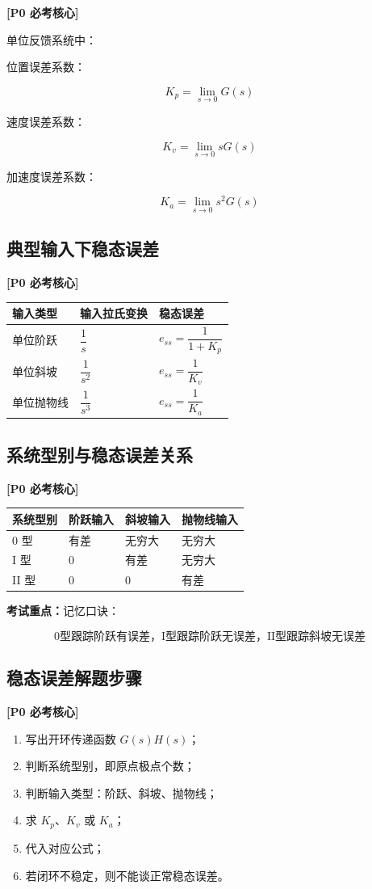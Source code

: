 \documentclass[UTF8,a4paper,12pt]{ctexart}
\newcommand{\Pzero}{\textcolor{p0}{\textbf{[P0 必考核心]}}}
\newcommand{\exam}{\textcolor{p0}{\textbf{考试重点：}}}
\begin{document}
\Pzero

单位反馈系统中：

位置误差系数：

\[
K_p=\lim_{s\to0}G(s)
\]

速度误差系数：

\[
K_v=\lim_{s\to0}sG(s)
\]

加速度误差系数：

\[
K_a=\lim_{s\to0}s^2G(s)
\]

\subsection{典型输入下稳态误差}

\Pzero

\begin{longtable}{p{4cm}p{4cm}p{5cm}}
\toprule
输入类型 & 输入拉氏变换 & 稳态误差 \\
\midrule
单位阶跃 & $\dfrac{1}{s}$ & $e_{ss}=\dfrac{1}{1+K_p}$ \\
单位斜坡 & $\dfrac{1}{s^2}$ & $e_{ss}=\dfrac{1}{K_v}$ \\
单位抛物线 & $\dfrac{1}{s^3}$ & $e_{ss}=\dfrac{1}{K_a}$ \\
\bottomrule
\end{longtable}

\subsection{系统型别与稳态误差关系}

\Pzero

\begin{longtable}{p{3cm}p{4cm}p{4cm}p{4cm}}
\toprule
系统型别 & 阶跃输入 & 斜坡输入 & 抛物线输入 \\
\midrule
0 型 & 有差 & 无穷大 & 无穷大 \\
I 型 & 0 & 有差 & 无穷大 \\
II 型 & 0 & 0 & 有差 \\
\bottomrule
\end{longtable}

\exam 记忆口诀：

\[
\text{0型跟踪阶跃有误差，I型跟踪阶跃无误差，II型跟踪斜坡无误差}
\]

\subsection{稳态误差解题步骤}

\Pzero

\begin{enumerate}
    \item 写出开环传递函数 $G(s)H(s)$；
    \item 判断系统型别，即原点极点个数；
    \item 判断输入类型：阶跃、斜坡、抛物线；
    \item 求 $K_p$、$K_v$ 或 $K_a$；
    \item 代入对应公式；
    \item 若闭环不稳定，则不能谈正常稳态误差。
\end{enumerate}
\end{document}
